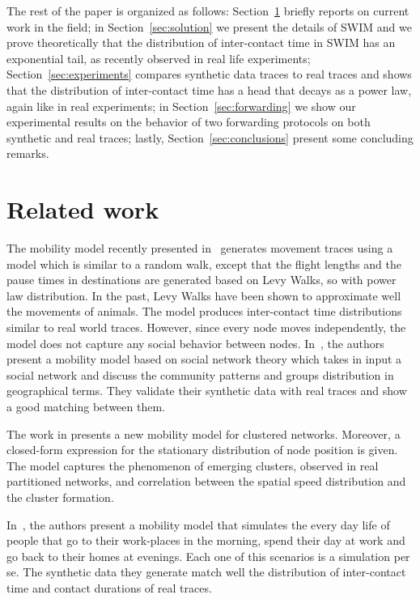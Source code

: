 \documentclass[conference]{IEEEtran}
\begin{document}
The rest of the paper is organized as follows: Section~\ref{sec:relatedwork} briefly reports on current work in the field; in Section~\ref{sec:solution} we present the details of SWIM and we prove theoretically that the distribution of inter-contact time in SWIM has an exponential tail, as recently observed in real life experiments; Section~\ref{sec:experiments} compares synthetic data traces to real traces and shows that the distribution of inter-contact time has a head that decays as a power law, again like in real experiments;
in Section~\ref{sec:forwarding} we show our experimental results on the behavior of two forwarding protocols on both synthetic and real traces; lastly, Section~\ref{sec:conclusions} present some concluding remarks.

\section{Related work}
\label{sec:relatedwork}

The mobility model recently presented in~\cite{levy} generates movement traces
using a model which is similar to a random walk, except that the flight lengths
and the pause times in destinations are generated based on Levy Walks, so with
power law distribution. In the past, Levy Walks have been shown to approximate
well the movements of animals. The model produces inter-contact time
distributions similar to real world traces. However, since every node moves
independently, the model does not capture any social behavior between nodes.
In~\cite{musolesi07}, the authors present a mobility model based on social
network theory which takes in input a social network and discuss the community
patterns and groups distribution in geographical terms. They validate their
synthetic data with real traces and show a good matching between them.

The work in \cite{LCA-CONF-2008-049} presents a new mobility model for clustered networks. Moreover, a closed-form expression for the stationary distribution of node position is given. The model captures the phenomenon of emerging clusters, observed in real partitioned networks, and correlation between the spatial speed distribution and the cluster formation.

In~\cite{workingDay}, the authors present a mobility model that simulates the every day life of people that go to their work-places in the morning, spend their day at work and go back to their homes at evenings. Each one of this scenarios is a simulation per se. The synthetic data they generate match well the distribution of inter-contact time and contact durations of real traces.
\end{document}
